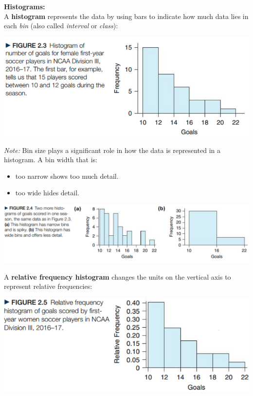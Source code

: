 \documentclass[../mathNotesPreamble]{subfiles}
\begin{document}
  {\noindent\Large\textbf{Histograms:}\\}
  \noindent
  A \textbf{histogram} represents the data by using bars to indicate how much data lies in each \emph{bin} (also called \emph{interval} or \emph{class}):
  \begin{center}
    \includegraphics[width=0.65\linewidth]{images/math211_figure_2p03}
  \end{center}
  \pagebreak

  \emph{Note:} Bin size plays a significant role in how the data is represented in a histogram. A bin width that is:
  \begin{itemize}
    \item too narrow shows too much detail.
    \item too wide hides detail.
  \end{itemize}
  \begin{center}
    \includegraphics[width=0.85\linewidth]{images/math211_figure_2p04}
  \end{center}
  A \textbf{relative frequency histogram} changes the units on the vertical axis to represent relative frequencies:
  \begin{center}
    \includegraphics[width=0.65\linewidth]{images/math211_figure_2p05}
  \end{center}
  \pagebreak
\end{document}
